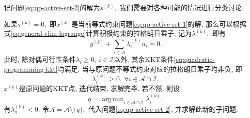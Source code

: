 \documentclass{SBCbookchapter}
\DeclareMathOperator*{\argmin}{arg\,min}
\numberwithin{equation}{section}
\begin{document}
记问题\eqref{eq:qp-active-set-2}的解为$s^{(k)},$ 我们需要对各种可能的情况进行分类讨论.

如果$s^{(k)} = 0,$ 即$x^{(k)}$是当前等式约束问题\eqref{eq:qp-active-set-1}的解, 那么可以根据式\eqref{eq:general-elim-lagrange}计算积极约束的拉格朗日乘子, 记为$\lambda^{(k)},$ 即有
\begin{equation}
\label{eq:qp-active-set-lambda}
g^{(k)} + \sum\limits_{i \in \mathcal{A}} \lambda_i^{(k)} \alpha_i = 0.
\end{equation}
此时, 除对偶可行性条件$\lambda_i \geqslant 0, ~ i \in \mathcal{I}$以外, 其余KKT条件\eqref{eq:quadratic-programming-kkt}均满足. 当与原问题不等式约束对应的拉格朗日乘子均非负, 即
\begin{equation*}
\lambda_i^{(k)} \geqslant 0, ~ \forall i \in \mathcal{A} \cap \mathcal{I},
\end{equation*}
$x^{(k)}$是原问题的KKT点, 迭代结束, 求解完毕. 若不然, 则设
\begin{equation*}
q = \argmin_{i \in \mathcal{A} \cap \mathcal{I}} \lambda_i^{(k)},
\end{equation*}
有$\lambda_q^{(k)} < 0.$ 令$\mathcal{A} = \mathcal{A} \setminus \{ q \},$ 代入问题\eqref{eq:qp-active-set-2}, 并求解此新的子问题.
\end{document}
